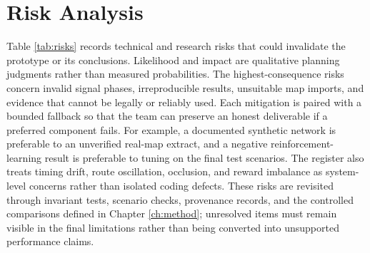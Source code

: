 \section{Risk Analysis}

Table \ref{tab:risks} records technical and research risks that could invalidate the prototype or its conclusions. Likelihood and impact are qualitative planning judgments rather than measured probabilities. The highest-consequence risks concern invalid signal phases, irreproducible results, unsuitable map imports, and evidence that cannot be legally or reliably used. Each mitigation is paired with a bounded fallback so that the team can preserve an honest deliverable if a preferred component fails. For example, a documented synthetic network is preferable to an unverified real-map extract, and a negative reinforcement-learning result is preferable to tuning on the final test scenarios. The register also treats timing drift, route oscillation, occlusion, and reward imbalance as system-level concerns rather than isolated coding defects. These risks are revisited through invariant tests, scenario checks, provenance records, and the controlled comparisons defined in Chapter \ref{ch:method}; unresolved items must remain visible in the final limitations rather than being converted into unsupported performance claims.

